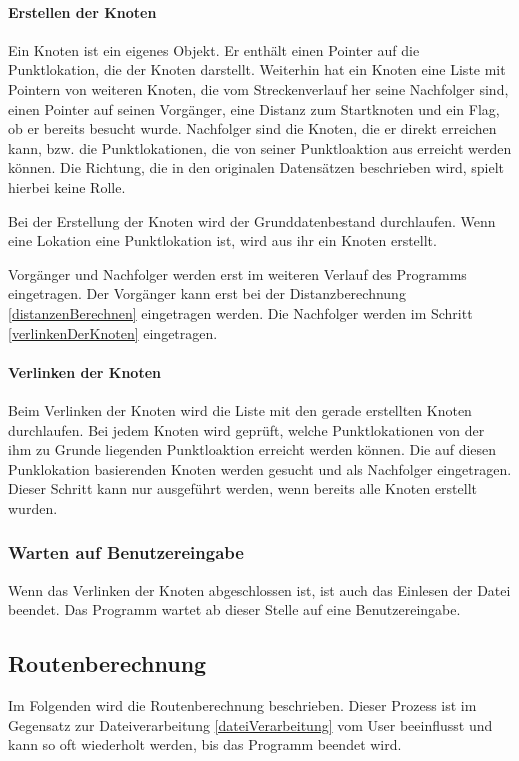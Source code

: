 \documentclass[12pt, a4paper, ngerman]{article}
\begin{document}
\paragraph{Erstellen der Knoten \label{knotenErstellen}}
Ein Knoten ist ein eigenes Objekt. Er enthält einen Pointer auf die Punktlokation, die der Knoten darstellt. Weiterhin hat ein Knoten eine Liste mit Pointern von weiteren Knoten, die vom Streckenverlauf her seine Nachfolger sind, einen Pointer auf seinen Vorgänger, eine Distanz zum Startknoten und ein Flag, ob er bereits besucht wurde. Nachfolger sind die Knoten, die er direkt erreichen kann, bzw. die Punktlokationen, die von seiner Punktloaktion aus erreicht werden können. Die Richtung, die in den originalen Datensätzen beschrieben wird, spielt hierbei keine Rolle.

Bei der Erstellung der Knoten wird der Grunddatenbestand durchlaufen. Wenn eine Lokation eine Punktlokation ist, wird aus ihr ein Knoten erstellt. 


Vorgänger und Nachfolger werden erst im weiteren Verlauf des Programms eingetragen. Der Vorgänger kann erst bei der Distanzberechnung \ref{distanzenBerechnen} eingetragen werden. Die Nachfolger werden im Schritt \ref{verlinkenDerKnoten} eingetragen.

\paragraph{Verlinken der Knoten \label{verlinkenDerKnoten}} 
Beim Verlinken der Knoten wird die Liste mit den gerade erstellten Knoten durchlaufen. Bei jedem Knoten wird geprüft, welche Punktlokationen von der ihm zu Grunde liegenden Punktloaktion erreicht werden können. Die auf diesen Punklokation basierenden Knoten werden gesucht und als Nachfolger eingetragen. Dieser Schritt kann nur ausgeführt werden, wenn bereits alle Knoten erstellt wurden.

\subsubsection{Warten auf Benutzereingabe}
Wenn das Verlinken der Knoten abgeschlossen ist, ist auch das Einlesen der Datei beendet. Das Programm wartet ab dieser Stelle auf eine Benutzereingabe.

\subsection{Routenberechnung}
Im Folgenden wird die Routenberechnung beschrieben. Dieser Prozess ist im Gegensatz zur Dateiverarbeitung \ref{dateiVerarbeitung} vom User beeinflusst und kann so oft wiederholt werden, bis das Programm beendet wird.
\end{document}
